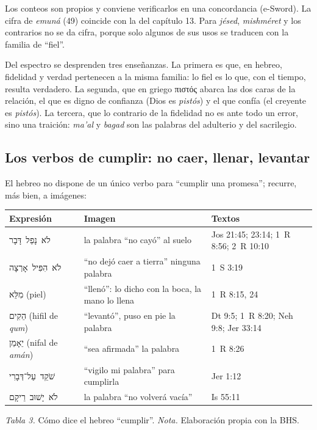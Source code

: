 \documentclass[11pt,letterpaper]{article}
\newcommand{\heb}[1]{\mbox{\foreignlanguage{hebrew}{#1}}}
\newcommand{\grc}[1]{\foreignlanguage{ancientgreek}{#1}}
\begin{document}
\begin{nota}[Precisión]
Los conteos son propios y conviene verificarlos en una concordancia (e-Sword). La cifra de \emph{emuná} (49) coincide con la del capítulo 13. Para \emph{jésed}, \emph{mishméret} y los contrarios no se da cifra, porque solo algunos de sus usos se traducen con la familia de ``fiel''.
\end{nota}

Del espectro se desprenden tres enseñanzas. La primera es que, en hebreo, fidelidad y verdad pertenecen a la misma familia: lo fiel es lo que, con el tiempo, resulta verdadero. La segunda, que en griego \grc{πιστός} abarca las dos caras de la relación, el que es digno de confianza (Dios es \emph{pistós}) y el que confía (el creyente es \emph{pistós}). La tercera, que lo contrario de la fidelidad no es ante todo un error, sino una traición: \emph{ma'al} y \emph{bagad} son las palabras del adulterio y del sacrilegio.

\subsection{Los verbos de cumplir: no caer, llenar, levantar}
El hebreo no dispone de un único verbo para ``cumplir una promesa''; recurre, más bien, a imágenes:

\begin{center}\small\renewcommand{\arraystretch}{1.2}
\begin{tabular}{@{}L{3.6cm}L{6.6cm}L{4.2cm}@{}}
\toprule
\textbf{Expresión} & \textbf{Imagen} & \textbf{Textos} \\ \midrule
\heb{לֹא נָפַל דָּבָר} & la palabra ``no cayó'' al suelo & Jos 21:45; 23:14; 1~R 8:56; 2~R 10:10 \\
\heb{לֹא הִפִּיל אָרְצָה} & ``no dejó caer a tierra'' ninguna palabra & 1~S 3:19 \\
\heb{מִלֵּא} (piel) & ``llenó'': lo dicho con la boca, la mano lo llena & 1~R 8:15, 24 \\
\heb{הֵקִים} (hifil de \emph{qum}) & ``levantó'', puso en pie la palabra & Dt 9:5; 1~R 8:20; Neh 9:8; Jer 33:14 \\
\heb{יֵאָמֵן} (nifal de \emph{amán}) & ``sea afirmada'' la palabra & 1~R 8:26 \\
\heb{שֹׁקֵד עַל־דְּבָרִי} & ``vigilo mi palabra'' para cumplirla & Jer 1:12 \\
\heb{לֹא יָשׁוּב רֵיקָם} & la palabra ``no volverá vacía'' & Is 55:11 \\
\bottomrule
\end{tabular}\par
{\footnotesize\color{gris}\textit{Tabla 3.} Cómo dice el hebreo ``cumplir''. \textit{Nota.} Elaboración propia con la BHS.}
\end{center}
\end{document}
